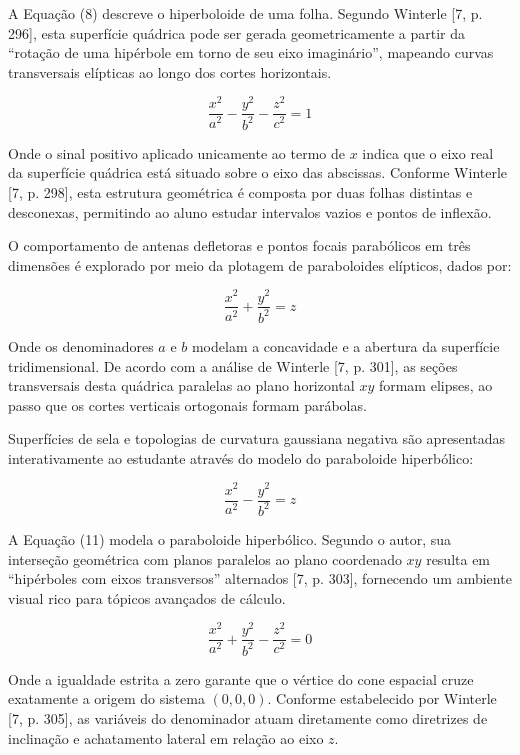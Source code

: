 \documentclass[conference,a4paper]{IEEEtran}
\begin{document}
A Equação (8) descreve o hiperboloide de uma folha. Segundo Winterle [7, p. 296], esta superfície quádrica pode ser gerada geometricamente a partir da ``rotação de uma hipérbole em torno de seu eixo imaginário'', mapeando curvas transversais elípticas ao longo dos cortes horizontais.

\begin{equation}
\frac{x^2}{a^2}-\frac{y^2}{b^2}-\frac{z^2}{c^2} = 1 \tag{9}
\end{equation}

Onde o sinal positivo aplicado unicamente ao termo de $x$ indica que o eixo real da superfície quádrica está situado sobre o eixo das abscissas. Conforme Winterle [7, p. 298], esta estrutura geométrica é composta por duas folhas distintas e desconexas, permitindo ao aluno estudar intervalos vazios e pontos de inflexão.

O comportamento de antenas defletoras e pontos focais parabólicos em três dimensões é explorado por meio da plotagem de paraboloides elípticos, dados por:

\begin{equation}
\frac{x^2}{a^2}+\frac{y^2}{b^2} = z \tag{10}
\end{equation}

Onde os denominadores $a$ e $b$ modelam a concavidade e a abertura da superfície tridimensional. De acordo com a análise de Winterle [7, p. 301], as seções transversais desta quádrica paralelas ao plano horizontal $xy$ formam elipses, ao passo que os cortes verticais ortogonais formam parábolas.

Superfícies de sela e topologias de curvatura gaussiana negativa são apresentadas interativamente ao estudante através do modelo do paraboloide hiperbólico:

\begin{equation}
\frac{x^2}{a^2}-\frac{y^2}{b^2} = z \tag{11}
\end{equation}

A Equação (11) modela o paraboloide hiperbólico. Segundo o autor, sua interseção geométrica com planos paralelos ao plano coordenado $xy$ resulta em ``hipérboles com eixos transversos'' alternados [7, p. 303], fornecendo um ambiente visual rico para tópicos avançados de cálculo.

\begin{equation}
\frac{x^2}{a^2}+\frac{y^2}{b^2}-\frac{z^2}{c^2} = 0 \tag{12}
\end{equation}

Onde a igualdade estrita a zero garante que o vértice do cone espacial cruze exatamente a origem do sistema $(0,0,0)$. Conforme estabelecido por Winterle [7, p. 305], as variáveis do denominador atuam diretamente como diretrizes de inclinação e achatamento lateral em relação ao eixo $z$.
\end{document}
